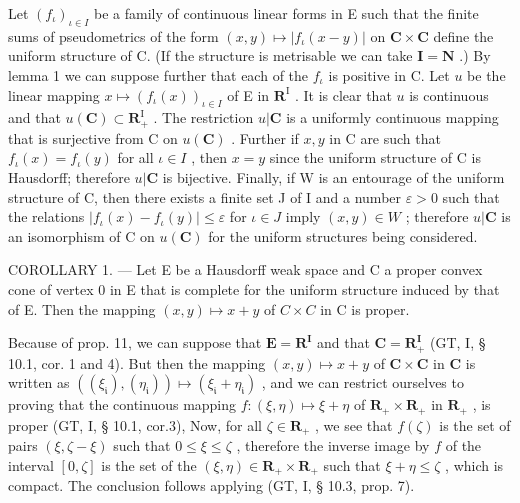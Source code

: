 Let \((f_{\iota})_{\iota \in I}\) be a family of continuous linear forms in E such that the finite sums of pseudometrics of the form \((x, y) \mapsto |f_{\iota}(x - y)|\) on \(\mathbf{C} \times \mathbf{C}\) define the uniform structure of C. (If the structure is metrisable we can take \(\mathbf{I} = \mathbf{N}\) .) By lemma 1 we can suppose further that each of the \(f_{\iota}\) is positive in C. Let \(u\) be the linear mapping \(x \mapsto (f_{\iota}(x))_{\iota \in I}\) of E in \(\mathbf{R}^{\mathrm{I}}\) . It is clear that \(u\) is continuous and that \(u(\mathbf{C}) \subset \mathbf{R}_{+}^{\mathrm{I}}\) . The restriction \(u|\mathbf{C}\) is a uniformly continuous mapping that is surjective from C on \(u(\mathbf{C})\) . Further if \(x, y\) in C are such that \(f_{\iota}(x) = f_{\iota}(y)\) for all \(\iota \in I\) , then \(x = y\) since the uniform structure of C is Hausdorff; therefore \(u|\mathbf{C}\) is bijective. Finally, if W is an entourage of the uniform structure of C, then there exists a finite set J of I and a number \(\varepsilon > 0\) such that the relations \(|f_{\iota}(x) - f_{\iota}(y)| \leqslant \varepsilon\) for \(\iota \in J\) imply \((x, y) \in W\) ; therefore \(u|\mathbf{C}\) is an isomorphism of C on \(u(\mathbf{C})\) for the uniform structures being considered.

COROLLARY 1. --- Let E be a Hausdorff weak space and C a proper convex cone of vertex 0 in E that is complete for the uniform structure induced by that of E. Then the mapping \((x, y) \mapsto x + y\) of \(C \times C\) in C is proper.

Because of prop. 11, we can suppose that \(\mathbf{E} = \mathbf{R}^{\mathbf{I}}\) and that \(\mathbf{C} = \mathbf{R}_{+}^{\mathbf{I}}\) (GT, I, § 10.1, cor. 1 and 4). But then the mapping \((x, y) \mapsto x + y\) of \(\mathbf{C} \times \mathbf{C}\) in \(\mathbf{C}\) is written as \(((\xi_{\mathfrak{i}}), (\eta_{\mathfrak{i}})) \mapsto (\xi_{\mathfrak{i}} + \eta_{\mathfrak{i}})\) , and we can restrict ourselves to proving that the continuous mapping \(f: (\xi, \eta) \mapsto \xi + \eta\) of \(\mathbf{R}_{+} \times \mathbf{R}_{+}\) in \(\mathbf{R}_{+}\) , is proper (GT, I, § 10.1, cor.3), Now, for all \(\zeta \in \mathbf{R}_{+}\) , we see that \(f(\zeta)\) is the set of pairs \((\xi, \zeta - \xi)\) such that \(0 \leqslant \xi \leqslant \zeta\) , therefore the inverse image by \(f\) of the interval \([0, \zeta]\) is the set of the \((\xi, \eta) \in \mathbf{R}_{+} \times \mathbf{R}_{+}\) such that \(\xi + \eta \leqslant \zeta\) , which is compact. The conclusion follows applying (GT, I, § 10.3, prop. 7).

